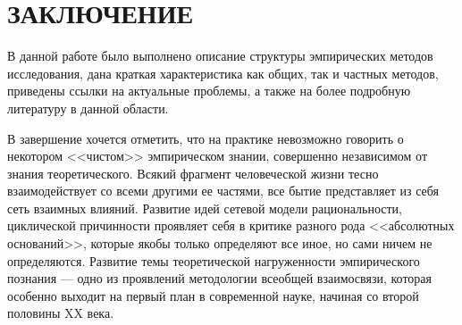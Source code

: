 \section*{ЗАКЛЮЧЕНИЕ}

В данной работе было выполнено описание структуры эмпирических методов исследования,
дана краткая характеристика как общих, так и частных методов,
приведены ссылки на актуальные проблемы, а также на более подробную литературу в данной области.

В завершение хочется отметить,
что на практике невозможно говорить о некотором <<чистом>> эмпирическом знании,
совершенно независимом от знания теоретического.
Всякий фрагмент человеческой жизни тесно взаимодействует со всеми другими ее частями,
все бытие представляет из себя сеть взаимных влияний.
Развитие идей сетевой модели рациональности, циклической причинности проявляет
себя в критике разного рода <<абсолютных оснований>>,
которые якобы только определяют все иное, но сами ничем не определяются.
Развитие темы теоретической нагруженности эмпирического познания --- одно из проявлений
методологии всеобщей взаимосвязи, которая особенно выходит на первый план в современной науке,
начиная со второй половины XX века.
